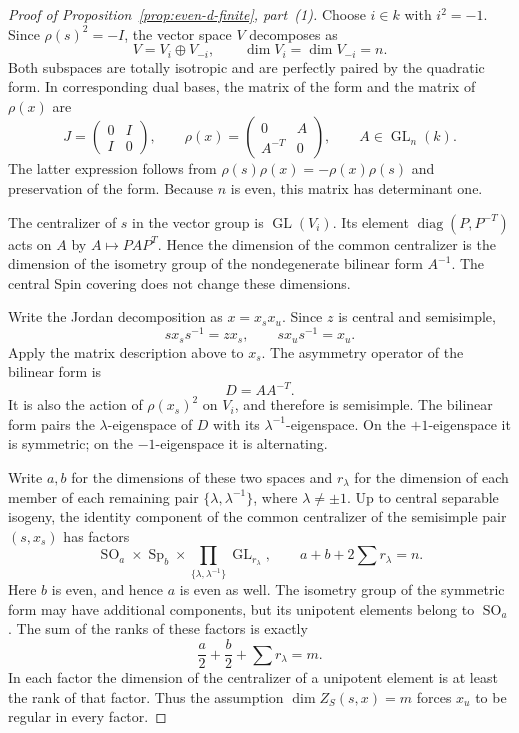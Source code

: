 \documentclass[11pt,a4paper]{article}
\theoremstyle{definition}
\theoremstyle{remark}
\begin{document}
\begin{proof}[Proof of Proposition~\ref{prop:even-d-finite}, part~(1)]
Choose \(i\in k\) with \(i^2=-1\). Since \(\rho(s)^2=-I\), the vector
space \(V\) decomposes as
\[
V=V_i\oplus V_{-i},
\qquad
\dim V_i=\dim V_{-i}=n.
\]
Both subspaces are totally isotropic and are perfectly paired by the
quadratic form. In corresponding dual bases, the matrix of the form and
the matrix of \(\rho(x)\) are
\[
J=\begin{pmatrix}0&I\\ I&0\end{pmatrix},
\qquad
\rho(x)=\begin{pmatrix}0&A\\ A^{-T}&0\end{pmatrix},
\qquad
A\in\operatorname{GL}_n(k).
\]
The latter expression follows from
\(\rho(s)\rho(x)=-\rho(x)\rho(s)\) and preservation of the form.
Because \(n\) is even, this matrix has determinant one.

The centralizer of \(s\) in the vector group is
\(\operatorname{GL}(V_i)\). Its element
\(\operatorname{diag}(P,P^{-T})\) acts on \(A\) by
\(A\mapsto PAP^T\). Hence the dimension of the common centralizer is
the dimension of the isometry group of the nondegenerate bilinear form
\(A^{-1}\). The central Spin covering does not change these dimensions.

Write the Jordan decomposition as \(x=x_sx_u\). Since \(z\) is central
and semisimple,
\[
sx_ss^{-1}=zx_s,\qquad sx_us^{-1}=x_u.
\]
Apply the matrix description above to \(x_s\). The asymmetry operator of
the bilinear form is
\[
D=AA^{-T}.
\]
It is also the action of \(\rho(x_s)^2\) on \(V_i\), and therefore is
semisimple. The bilinear form pairs the \(\lambda\)-eigenspace of \(D\)
with its \(\lambda^{-1}\)-eigenspace. On the \(+1\)-eigenspace it is
symmetric; on the \(-1\)-eigenspace it is alternating.

Write \(a,b\) for the dimensions of these two spaces and
\(r_\lambda\) for the dimension of each member of each remaining pair
\(\{\lambda,\lambda^{-1}\}\), where \(\lambda\neq\pm1\). Up to central
separable isogeny, the identity component of the common centralizer of
the semisimple pair \((s,x_s)\) has factors
\[
\operatorname{SO}_a\times\operatorname{Sp}_b
\times
\prod_{\{\lambda,\lambda^{-1}\}}
\operatorname{GL}_{r_\lambda},
\qquad
a+b+2\sum r_\lambda=n.
\]
Here \(b\) is even, and hence \(a\) is even as well. The isometry group
of the symmetric form may have additional components, but its
unipotent elements belong to \(\operatorname{SO}_a\). The sum of the
ranks of these factors is exactly
\[
\frac a2+\frac b2+\sum r_\lambda=m.
\]
In each factor the dimension of the centralizer of a unipotent element
is at least the rank of that factor. Thus the assumption
\(\dim Z_S(s,x)=m\) forces \(x_u\) to be regular in every factor.


\end{proof}
\end{document}
